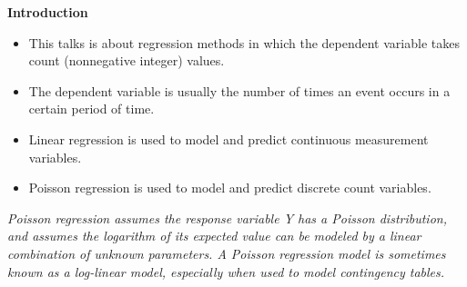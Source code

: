\documentclass[MASTER.tex]{subfiles}
\begin{document}
\begin{frame}
	\Large
\textbf{Introduction}
\begin{itemize}
\item This talks is about regression methods in which the dependent variable takes
 count (nonnegative integer) values. \item The dependent variable is usually the number of times an event occurs in a certain period of time.
\end{itemize}
\end{frame}
\begin{frame}[fragile]
	\begin{itemize}
		\item Linear regression is used to model and predict continuous measurement variables.
		\item Poisson regression is used to model and predict discrete count variables.
	\end{itemize}
	\textit{Poisson regression assumes the response variable Y has a Poisson distribution, and assumes the logarithm of its expected value can be modeled by a linear combination of unknown parameters. A Poisson regression model is sometimes known as a log-linear model, especially when used to model contingency tables.}
	
\end{frame}
%		
%		
\end{document}
